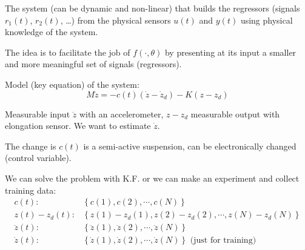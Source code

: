 \begin{figure}[H]
    \centering
\end{figure}

The system (can be dynamic and non-linear) that builds the regressors (signals $r_1(t)$, $r_2(t)$, \ldots) from the physical sensors $u(t)$ and $y(t)$ using physical knowledge of the system.

The idea is to facilitate the job of $f(\cdot, \theta)$ by presenting at its input a smaller and more meaningful set of signals (regressors).

\begin{exercise}
    Model (key equation) of the system:
    \[
        M\ddot{z} = -c(t)(\dot{z}-\dot{z}_d) - K(z-z_d)
    \]

    Measurable input $\ddot{z}$ with an accelerometer, $z-z_d$ measurable output with elongation sensor.
    We want to estimate $\dot{z}$.

    The change is $c(t)$ is a semi-active suspension, can be electronically changed (control variable).

    We can solve the problem with K.F. or we can make an experiment and collect training data:
    \begin{align*}
        c(t)        : & \left\{ c(1), c(2), \cdots, c(N) \right\} \\
        z(t)-z_d(t) : & \left\{ z(1)-z_d(1), z(2)-z_d(2), \cdots, z(N)-z_d(N) \right\} \\
        \ddot{z}(t) : & \left\{ \ddot{z}(1), \ddot{z}(2), \cdots, \ddot{z}(N) \right\} \\
        \dot{z}(t)  : & \left\{ \dot{z}(1), \dot{z}(2), \cdots, \dot{z}(N) \right\} \text{ (just for training)} \\
    \end{align*}
\end{exercise}
